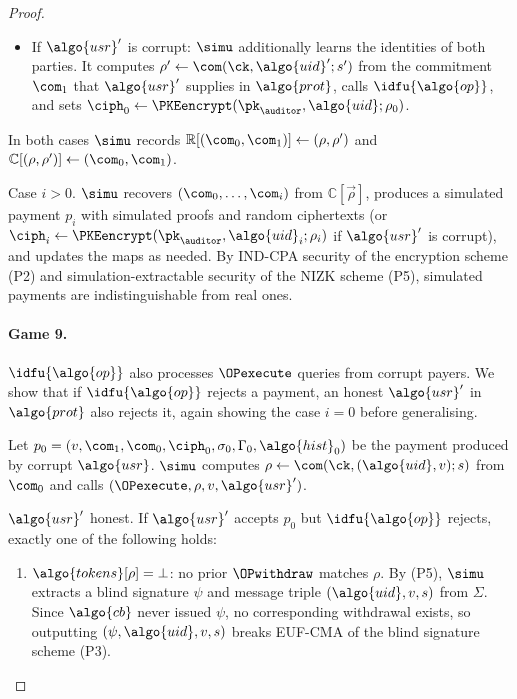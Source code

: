 \begin{proof}
\begin{itemize}
  \item If $\algo{usr}'$ is corrupt: $\simu$ additionally learns the identities
    of both parties. It computes $\rho' \leftarrow \com(\ck, \algo{uid}'; s')$
    from the commitment $\com_1$ that $\algo{usr}'$ supplies in $\algo{prot}$,
    calls $\idfu{\algo{op}}$, and sets $\ciph_0 \leftarrow \PKEencrypt(\pk_{\auditor},
    \algo{uid}; \rho_0)$.

\end{itemize}

In both cases $\simu$ records $\mathbb{R}[(\com_0, \com_1)] \gets (\rho,
\rho')$ and $\mathbb{C}[(\rho, \rho')] \gets (\com_0, \com_1)$.

Case $i > 0$. $\simu$ recovers $(\com_0, \ldots, \com_i)$ from
$\mathbb{C}[\vec{\rho}]$, produces a simulated payment $p_i$ with simulated
proofs and random ciphertexts (or $\ciph_i \leftarrow
\PKEencrypt(\pk_{\auditor}, \algo{uid}_i; \rho_i)$ if $\algo{usr}'$ is
corrupt), and updates the maps as needed. By IND-CPA security of the encryption
scheme (P2) and simulation-extractable security of the NIZK scheme (P5),
simulated payments are indistinguishable from real ones.

\paragraph{Game 9.} $\idfu{\algo{op}}$ also processes $\OPexecute$ queries from corrupt
payers. We show that if $\idfu{\algo{op}}$ rejects a payment, an honest $\algo{usr}'$ in
$\algo{prot}$ also rejects it, again showing the case $i = 0$ before
generalising.

Let $p_0 = (v, \com_1, \com_0, \ciph_0, \sigma_0, \Gamma_0, \algo{hist}_0)$ be
the payment produced by corrupt $\algo{usr}$. $\simu$ computes $\rho \leftarrow
\com(\ck, (\algo{uid}, v); s)$ from $\com_0$ and calls $(\OPexecute, \rho, v,
\algo{usr}')$.

$\algo{usr}'$ honest. If $\algo{usr}'$ accepts $p_0$ but $\idfu{\algo{op}}$ rejects,
exactly one of the following holds:

\begin{enumerate}[label=\alph*)]

  \item $\algo{tokens}[\rho] = \bot$: no prior $\OPwithdraw$ matches
    $\rho$. By (P5), $\simu$ extracts a blind signature $\psi$ and message
    triple $(\algo{uid}, v, s)$ from $\Sigma$. Since $\algo{cb}$ never issued
    $\psi$, no corresponding withdrawal exists, so outputting $(\psi,
    \algo{uid}, v, s)$ breaks EUF-CMA of the blind signature scheme (P3).


\end{enumerate}
\end{proof}
